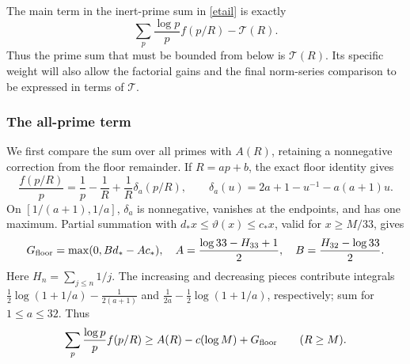 \documentclass[11pt]{article}
\newcommand{\Tn}{\mathcal T}
\begin{document}
The main term in the inert-prime sum in \eqref{etail} is exactly
\[
 \sum_p\frac{\log p}{p}f(p/R)-\Tn(R).
\]
Thus the prime sum that must be bounded from below is \(\Tn(R)\).
Its specific weight will also allow the factorial gains and the final
norm-series comparison to be expressed in terms of \(\Tn\).

\subsubsection{The all-prime term}
We first compare the sum over all primes with \(A(R)\), retaining a
nonnegative correction from the floor remainder.
If \(R=ap+b\), the exact floor identity gives
\[
 \frac{f(p/R)}p=\frac1p-\frac1R+\frac1R\delta_a(p/R),\qquad
 \delta_a(u)=2a+1-u^{-1}-a(a+1)u.
\]
On \([1/(a+1),1/a]\), \(\delta_a\) is nonnegative, vanishes at
the endpoints, and has one maximum. Partial summation with
\(d_*x\le\vartheta(x)\le c_*x\), valid for \(x\ge M/33\), gives
\begin{equation}\label{Gfloor}
 G_{\rm floor}=\max(0,Bd_*-Ac_*),\quad
 A=\frac{\log33-H_{33}+1}{2},\quad
 B=\frac{H_{32}-\log33}{2}.
\end{equation}
Here \(H_n=\sum_{j\le n}1/j\). The increasing and decreasing pieces
contribute integrals
\(\frac12\log(1+1/a)-\frac1{2(a+1)}\) and
\(\frac1{2a}-\frac12\log(1+1/a)\), respectively; sum for
\(1\le a\le32\). Thus
\begin{equation}\label{allf}
 \sum_p\frac{\log p}{p}f(p/R)
 \ge A(R)-c(\log M)+G_{\rm floor}\qquad(R\ge M).
\end{equation}
\end{document}
